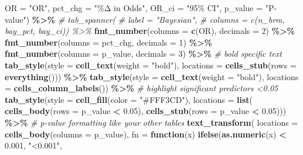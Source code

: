 \documentclass[
]{article}
\newenvironment{Shaded}{\begin{snugshade}}{\end{snugshade}}
\newcommand{\AttributeTok}[1]{\textcolor[rgb]{0.13,0.29,0.53}{#1}}
\newcommand{\CommentTok}[1]{\textcolor[rgb]{0.56,0.35,0.01}{\textit{#1}}}
\newcommand{\ControlFlowTok}[1]{\textcolor[rgb]{0.13,0.29,0.53}{\textbf{#1}}}
\newcommand{\DecValTok}[1]{\textcolor[rgb]{0.00,0.00,0.81}{#1}}
\newcommand{\FloatTok}[1]{\textcolor[rgb]{0.00,0.00,0.81}{#1}}
\newcommand{\FunctionTok}[1]{\textcolor[rgb]{0.13,0.29,0.53}{\textbf{#1}}}
\newcommand{\NormalTok}[1]{#1}
\newcommand{\SpecialCharTok}[1]{\textcolor[rgb]{0.81,0.36,0.00}{\textbf{#1}}}
\newcommand{\StringTok}[1]{\textcolor[rgb]{0.31,0.60,0.02}{#1}}
\begin{document}
\begin{Shaded}
\begin{Highlighting}[]
    \AttributeTok{OR =} \StringTok{"OR"}\NormalTok{,}
    \AttributeTok{pct\_chg =} \StringTok{"\%Δ in Odds"}\NormalTok{,}
    \AttributeTok{OR\_ci =} \StringTok{"95\% CI"}\NormalTok{,}
    \AttributeTok{p\_value  =} \StringTok{"P{-}value"}\NormalTok{) }\SpecialCharTok{\%\textgreater{}\%}
  \CommentTok{\# tab\_spanner(}
  \CommentTok{\#   label = "Bayesian",}
  \CommentTok{\#   columns = c(n\_brm, bay\_pct, bay\_ci)) \%\textgreater{}\%}
  \FunctionTok{fmt\_number}\NormalTok{(}\AttributeTok{columns =} \FunctionTok{c}\NormalTok{(OR), }\AttributeTok{decimals =} \DecValTok{2}\NormalTok{) }\SpecialCharTok{\%\textgreater{}\%}
  \FunctionTok{fmt\_number}\NormalTok{(}\AttributeTok{columns =}\NormalTok{ pct\_chg, }\AttributeTok{decimals =} \DecValTok{1}\NormalTok{) }\SpecialCharTok{\%\textgreater{}\%} 
  \FunctionTok{fmt\_number}\NormalTok{(}\AttributeTok{columns =}\NormalTok{ p\_value, }\AttributeTok{decimals =} \DecValTok{3}\NormalTok{) }\SpecialCharTok{\%\textgreater{}\%}
    \CommentTok{\# bold specific text}
  \FunctionTok{tab\_style}\NormalTok{(}\AttributeTok{style =} \FunctionTok{cell\_text}\NormalTok{(}\AttributeTok{weight =} \StringTok{"bold"}\NormalTok{),}
    \AttributeTok{locations =} \FunctionTok{cells\_stub}\NormalTok{(}\AttributeTok{rows =} \FunctionTok{everything}\NormalTok{())) }\SpecialCharTok{\%\textgreater{}\%}
  \FunctionTok{tab\_style}\NormalTok{(}\AttributeTok{style =} \FunctionTok{cell\_text}\NormalTok{(}\AttributeTok{weight =} \StringTok{"bold"}\NormalTok{),}
    \AttributeTok{locations =} \FunctionTok{cells\_column\_labels}\NormalTok{()) }\SpecialCharTok{\%\textgreater{}\%}
    \CommentTok{\# highlight significant predictors \textless{}0.05}
  \FunctionTok{tab\_style}\NormalTok{(}\AttributeTok{style =} \FunctionTok{cell\_fill}\NormalTok{(}\AttributeTok{color =} \StringTok{"\#FFF3CD"}\NormalTok{),}
            \AttributeTok{locations =} \FunctionTok{list}\NormalTok{(}
              \FunctionTok{cells\_body}\NormalTok{(}\AttributeTok{rows =}\NormalTok{ p\_value }\SpecialCharTok{\textless{}} \FloatTok{0.05}\NormalTok{),}
              \FunctionTok{cells\_stub}\NormalTok{(}\AttributeTok{rows =}\NormalTok{ p\_value }\SpecialCharTok{\textless{}} \FloatTok{0.05}\NormalTok{))) }\SpecialCharTok{\%\textgreater{}\%} 
  \CommentTok{\# p{-}value formatting like your other tables}
  \FunctionTok{text\_transform}\NormalTok{(}
    \AttributeTok{locations =} \FunctionTok{cells\_body}\NormalTok{(}\AttributeTok{columns =}\NormalTok{ p\_value),}
    \AttributeTok{fn =} \ControlFlowTok{function}\NormalTok{(x) }\FunctionTok{ifelse}\NormalTok{(}\FunctionTok{as.numeric}\NormalTok{(x) }\SpecialCharTok{\textless{}} \FloatTok{0.001}\NormalTok{, }\StringTok{"\textless{}0.001"}\NormalTok{,}

\end{Highlighting}
\end{Shaded}
\end{document}
